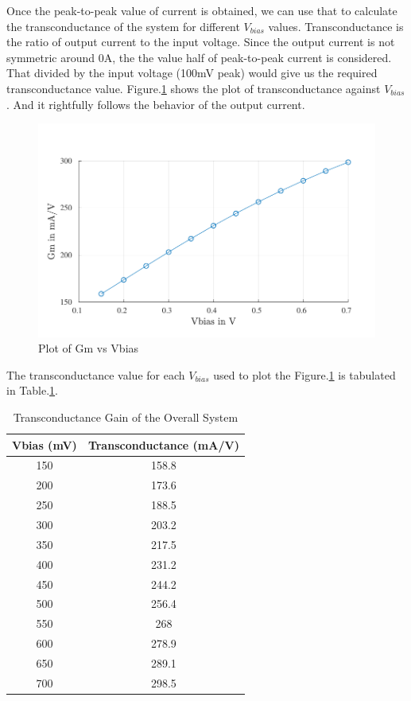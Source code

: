 Once the peak-to-peak value of current is obtained, we can use that to calculate the transconductance of the system for different $V_{bias}$ values. Transconductance is the ratio of output current to the input voltage. Since the output current is not symmetric around 0A, the the value half of peak-to-peak current is considered. That divided by the input voltage (100mV peak) would give us the required transconductance value. Figure.\ref{fig:GM} shows the plot of transconductance against $V_{bias}$. And it rightfully follows the behavior of the output current.

\begin{figure} [H]
\centering
\includegraphics[scale=1]{Figures/Plots/Ov_Gm.pdf}
\caption{Plot of Gm vs Vbias}
\label{fig:GM}
\end{figure}

The transconductance value for each $V_{bias}$ used to plot the Figure.\ref{fig:GM} is tabulated in Table.\ref{tab:GM}.

\begin{table} [H]
\centering
\begin{tabular}{@{}cc@{}}
\toprule
Vbias (mV)			& Transconductance (mA/V)	\\ \midrule
150					& 158.8 \\
200					& 173.6 \\
250					& 188.5 \\
300					& 203.2 \\
350					& 217.5 \\
400					& 231.2 \\
450					& 244.2 \\
500					& 256.4 \\
550					& 268 \\
600					& 278.9 \\
650					& 289.1 \\
700 				& 298.5 \\
\bottomrule
\end{tabular}
\caption{Transconductance Gain of the Overall System}
\label{tab:GM}
\end{table}

